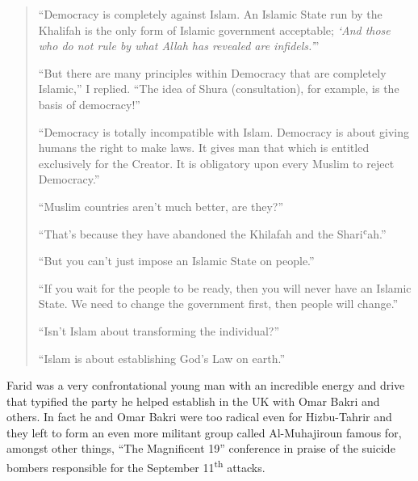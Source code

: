 \documentclass[12pt]{memoir}
\def\`{ʿ} %
\let \Sup=\textsuperscript
\begin{document}
\begin{quote}
“Democracy is completely against Islam.
An Islamic State run by the Khalifah
is the only form of Islamic government acceptable;
\emph{‘And those who do not rule by what Allah has revealed are infidels.’}”

“But there are many principles within Democracy
that are completely Islamic,” I replied.
“The idea of Shura (consultation), for example, is the basis of democracy!”

“Democracy is totally incompatible with Islam.
Democracy is about giving humans the right to make laws.
It gives man that which is entitled exclusively for the Creator.
It is obligatory upon every Muslim to reject Democracy.”

“Muslim countries aren’t much better, are they?”

“That’s because they have abandoned the Khilafah and the Shari\`ah.”

“But you can’t just impose an Islamic State on people.”

“If you wait for the people to be ready,
then you will never have an Islamic State.
We need to change the government first, then people will change.”

“Isn’t Islam about transforming the individual?”

“Islam is about establishing God’s Law on earth.”
\end{quote}

Farid was a very confrontational young man with an incredible energy
and drive that typified the party he helped establish
in the UK with Omar Bakri and others.
In fact he and Omar Bakri were too radical even for Hizbu-Tahrir
and they left to form an even more militant group
called Al-Muhajiroun famous for, amongst other things,
“The Magnificent 19” conference in praise of the suicide bombers
responsible for the September 11\Sup{th} attacks.
\end{document}
